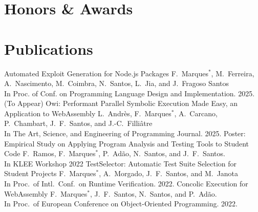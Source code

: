 \documentclass[11pt,a4paper,sans]{moderncv}   %
\begin{document}
\section{Honors \& Awards}


\newpage
\section{Publications}%
%
{Automated Exploit Generation for Node.js Packages}{}{}{}%
{F.\ Marques$^\ast$,
  M.\ Ferreira,
  A.\ Nascimento,
  M.\ Coimbra,
  N.\ Santos,
  L.\ Jia, and
  J.\ Fragoso Santos \\
In Proc. of Conf. on Programming Language Design and Implementation. 2025. (To Appear)
}
%
%
%
{Owi: Performant Parallel Symbolic Execution Made Easy, an Application to WebAssembly}{}{}{}%
{L.\ Andr\`{e}s,
  F.\ Marques$^\ast$,
  A.\ Carcano,
  P.\ Chambart,
  J.\ F.\ Santos, and
  J.-C.\ Filli\^{a}tre \\
In The Art, Science, and Engineering of Programming Journal. 2025.
}
%
%
{Poster: Empirical Study on Applying Program Analysis and Testing Tools to Student Code}{}{}{}%
{F.\ Ramos,
  F.\ Marques$^\ast$,
  P.\ Ad\~ao,
  N.\ Santos, and
  J.\ F.\ Santos. \\
In KLEE Workshop 2022
}
%
%
{TestSelector: Automatic Test Suite Selection for Student Projects}{}{}{}%
{F.\ Marques$^\ast$,
  A.\ Morgado,
  J.\ F.\ Santos, and
  M.\ Janota \\
In Proc.\ of Intl.\ Conf.\ on Runtime Verification. 2022.
}
%
%
{Concolic Execution for WebAssembly}{}{}{}%
{F.\ Marques$^\ast$, J.\ F.\ Santos, N.\ Santos, and P.\ Ad\~ao.\\
In Proc.\ of European Conference on Object-Oriented Programming. 2022.
}
\end{document}
